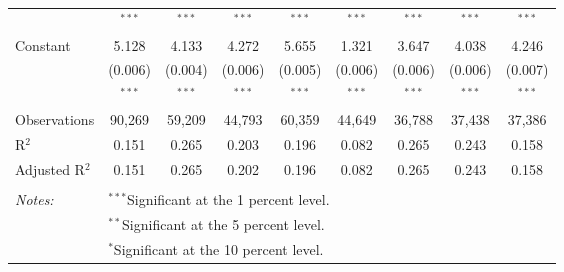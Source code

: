 \documentclass[a4paper,12pt]{thesis}
\begin{document}
\begin{table}[!htbp]
\begin{tabular}{@{\extracolsep{-8pt}}lcccccccc}
		& $^{***}$ & $^{***}$ & $^{***}$ & $^{***}$ & $^{***}$ & $^{***}$ & $^{***}$ & $^{***}$ \\ 
		Constant & 5.128 & 4.133 & 4.272 & 5.655 & 1.321 & 3.647 & 4.038 & 4.246 \\ 
		& (0.006) & (0.004) & (0.006) & (0.005) & (0.006) & (0.006) & (0.006) & (0.007) \\ 
		& $^{***}$ & $^{***}$ & $^{***}$ & $^{***}$ & $^{***}$ & $^{***}$ & $^{***}$ & $^{***}$ \\ 
		Observations & 90,269 & 59,209 & 44,793 & 60,359 & 44,649 & 36,788 & 37,438 & 37,386 \\ 
		R$^{2}$ & 0.151 & 0.265 & 0.203 & 0.196 & 0.082 & 0.265 & 0.243 & 0.158 \\ 
		Adjusted R$^{2}$ & 0.151 & 0.265 & 0.202 & 0.196 & 0.082 & 0.265 & 0.243 & 0.158 \\  
		\hline \\[-1.8ex] 
		\textit{Notes:} & \multicolumn{8}{l}{$^{***}$Significant at the 1 percent level.} \\ 
		& \multicolumn{8}{l}{$^{**}$Significant at the 5 percent level.} \\ 
		& \multicolumn{8}{l}{$^{*}$Significant at the 10 percent level.} \\ 
	\end{tabular} 
\end{table} 
\end{document}
